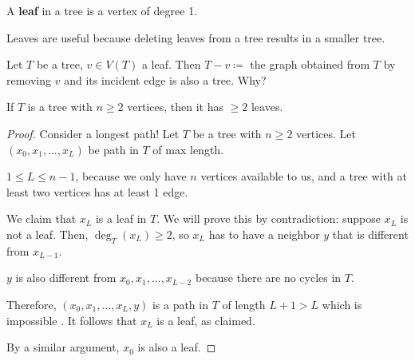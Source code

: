 \begin{definition}
	A \textbf{leaf} in a tree is a vertex of degree 1.
\end{definition}
\begin{remark}
	Leaves are useful because deleting leaves from a tree results in a smaller tree.
\end{remark}

\begin{problem}
	Let \( T \) be a tree, \( v \in  V(T) \) a leaf. Then \( T-v \coloneqq \) the graph obtained from \( T \) by removing \( v \) and its incident edge is also a tree. Why?
\end{problem}

\begin{prop}
	If \( T \) is a tree with \( n \ge 2 \) vertices, then it has \( \ge 2 \) leaves.
\end{prop}
\begin{proof}
	Consider a longest path! Let \( T \) be a tree with \( n\ge 2 \) vertices. Let \( (x_{0}, x_{1}, \ldots , x_L) \) be  path in \( T \) of max length.
	\begin{note}
		\( 1 \le L \le n - 1 \), because we only have \( n \) vertices available to us, and a tree with at least two vertices has at least 1 edge.
	\end{note}
	We claim that \( x_L \) is a leaf in \( T \). We will prove this by contradiction: suppose \( x_L \) is not a leaf. Then, \( \deg_T(x_L) \ge 2 \), so \( x_L \) has to have a neighbor \( y \) that is different from \( x_{L-1} \).
	\begin{note}
		\( y \) is also different from \( x_{0}, x_{1}, \ldots , x_{L - 2} \) because there are no cycles in \( T \).
	\end{note}
	Therefore, \( (x_{0}, x_{1}, \ldots, x_L, y) \) is a path in \( T \) of length \( L + 1 > L \) which is impossible \contra. It follows that \( x_L \) is a leaf, as claimed. \par
	By a similar argument, \( x_{0} \) is also a leaf.
\end{proof}

